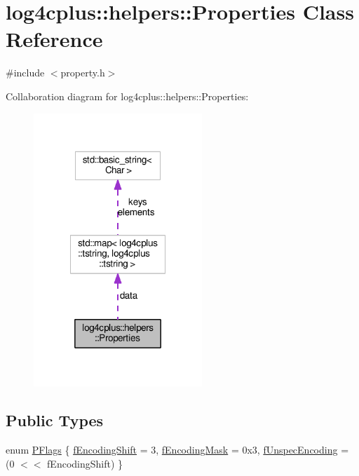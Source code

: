 \hypertarget{classlog4cplus_1_1helpers_1_1Properties}{\section{log4cplus\-:\-:helpers\-:\-:Properties Class Reference}
\label{classlog4cplus_1_1helpers_1_1Properties}
}


{\ttfamily \#include $<$property.\-h$>$}



Collaboration diagram for log4cplus\-:\-:helpers\-:\-:Properties\-:
\nopagebreak
\begin{figure}[H]
\begin{center}
\leavevmode
\includegraphics[width=180pt]{classlog4cplus_1_1helpers_1_1Properties__coll__graph}
\end{center}
\end{figure}
\subsection*{Public Types}
\begin{DoxyCompactItemize}
\item 
enum \hyperlink{classlog4cplus_1_1helpers_1_1Properties_a73cc33c3e49e6af9cd8ef12de343ef75}{P\-Flags} \{ \hyperlink{classlog4cplus_1_1helpers_1_1Properties_a73cc33c3e49e6af9cd8ef12de343ef75a459a595638b7348a05ff7c460a2b505c}{f\-Encoding\-Shift} = 3, 
\hyperlink{classlog4cplus_1_1helpers_1_1Properties_a73cc33c3e49e6af9cd8ef12de343ef75a03c446556a2d02171f71a1fc09cd448a}{f\-Encoding\-Mask} = 0x3, 
\hyperlink{classlog4cplus_1_1helpers_1_1Properties_a73cc33c3e49e6af9cd8ef12de343ef75a8ac6fe6de4160df0d1e1fba51809c9fa}{f\-Unspec\-Encoding} = (0 $<$$<$ f\-Encoding\-Shift)
 \}
\end{DoxyCompactItemize}
